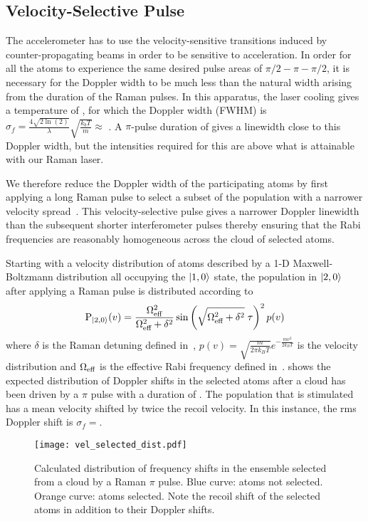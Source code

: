 \subsection{Velocity-Selective Pulse}\label{subsec:vel_select}
The accelerometer has to use the velocity-sensitive transitions
induced by counter-propagating beams in order to be sensitive to
acceleration. In order for all the atoms to experience the same
desired pulse areas of $\pi/2-\pi-\pi/2$, it is necessary for the
Doppler width to be much less than the natural width arising from the
duration of the Raman pulses. In this apparatus, the laser cooling
gives a temperature of , for which the Doppler
width (FWHM) is \(\sigma_f = \frac{4 \sqrt{2 \ln(2)}}{\lambda}\sqrt{\frac{k_b T}{m}}
\approx\) . 
A $\pi$-pulse duration of  gives a
linewidth close
to this Doppler width, but the intensities required for this are above
what is attainable with our Raman laser. 
\par\noindent
We therefore reduce the Doppler width of the participating atoms
by first applying a long Raman pulse to select a subset of the population
with a narrower velocity spread~\cite{Moler1992}. This
velocity-selective pulse gives a narrower Doppler linewidth than the
subsequent shorter
interferometer pulses thereby ensuring that the Rabi frequencies are
reasonably homogeneous across the cloud of selected atoms.
\par\noindent 
Starting with a velocity distribution of atoms
described by a 1-D Maxwell-Boltzmann distribution all occupying the
\(\ket{1,0}\) state, the
population in \(\ket{2,0}\) after applying a Raman pulse is
distributed according to
\begin{equation}
  \text{P}_{\ket{2,0}}(v) = \frac{\Omega_\textnormal{eff}^2}{\Omega_\textnormal{eff}^2 + \delta^2}
  \sin\left(\sqrt{\Omega_\textnormal{eff}^2+\delta^2}\;\tau\right)^2 p(v)
  \label{eq:vel_selected_dist}
\end{equation}
where \(\delta\) is the Raman detuning defined
in~, \(p(v) = \sqrt{\frac{m}{2\pi
k_B T}} e^{-\frac{m v^2}{2 k_B T}}\) is the velocity distribution and
\(\Omega_\textnormal{eff}\) is the effective Rabi frequency defined
in~. 
shows the expected
distribution of Doppler shifts in the selected atoms after a
 cloud has been driven by a $\pi$ pulse with a duration of
.
The population that is stimulated
has a mean velocity shifted by twice the recoil velocity. In this
instance, the rms
Doppler shift is \(\sigma_f
=\).
\begin{figure}[htpb!]
  \centering
  \texttt{[image: vel\_selected\_dist.pdf]}
  \caption[Simulated velocity distribution after a Raman $\pi$
  pulse.]{Calculated distribution of frequency shifts in the ensemble
    selected from a 
  cloud by a  Raman \(\pi\)
pulse. Blue curve: atoms not selected. Orange curve: atoms selected.
Note the recoil shift of the selected atoms in addition to their
Doppler shifts. }
  \label{fig:vel_selected_dist}
\end{figure}
